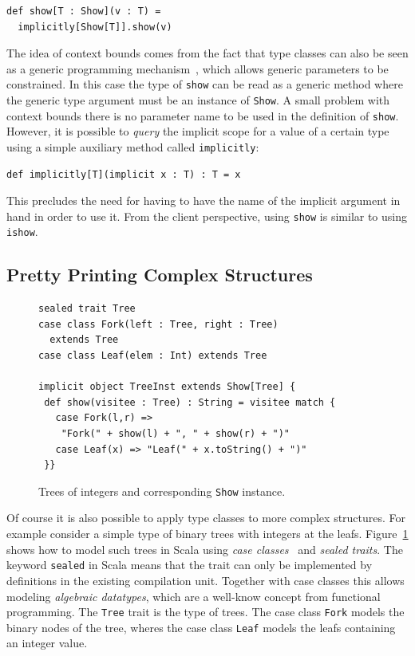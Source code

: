 \documentclass[preprint,nocopyrightspace]{sigplanconf}
\begin{document}
\begin{lstlisting}
def show[T : Show](v : T) = 
  implicitly[Show[T]].show(v)
\end{lstlisting}

The idea of context bounds comes from the fact that type classes can
also be seen as a generic programming mechanism~\cite{GP}, which allows
generic parameters to be constrained. In this case the type of
\lstinline{show} can be read as a generic method where the generic
type argument must be an instance of \lstinline{Show}.
A small problem with context bounds there is no parameter name to be used in the
definition of \lstinline{show}. However, it is possible to
\emph{query} the implicit scope for a value of a certain type
using a simple auxiliary method called \lstinline{implicitly}:

\begin{lstlisting}
def implicitly[T](implicit x : T) : T = x
\end{lstlisting}

This precludes the need for having to have the name of the implicit
argument in hand in order to use it.
From the client perspective, using \lstinline{show} is similar to
using \lstinline{ishow}.

\subsection{Pretty Printing Complex Structures}\label{sec:pretty-printing-complex}

\begin{figure}
\begin{lstlisting}
sealed trait Tree
case class Fork(left : Tree, right : Tree)
  extends Tree
case class Leaf(elem : Int) extends Tree

implicit object TreeInst extends Show[Tree] {
 def show(visitee : Tree) : String = visitee match {
   case Fork(l,r) =>
    "Fork(" + show(l) + ", " + show(r) + ")"
   case Leaf(x) => "Leaf(" + x.toString() + ")"
 }}
\end{lstlisting}
\caption{Trees of integers and corresponding \lstinline{Show}
  instance.}
\label{fig:trees}
\end{figure}

Of course it is also possible to apply type classes to more complex
structures. For example consider a simple type of binary trees with
integers at the leafs. Figure~\ref{fig:trees} shows how to model such
trees in Scala using \emph{case classes}~\cite{Match} and \emph{sealed
  traits}. The keyword \lstinline{sealed} in Scala means that the
trait can only be implemented by definitions in the existing
compilation unit.
Together with case classes this allows modeling \emph{algebraic
  datatypes}, which are a well-know concept from functional programming.
The \lstinline{Tree} trait is the type of trees. The case class
\lstinline{Fork} models the binary nodes of the tree, wheres the case
class \lstinline{Leaf} models the leafs containing an integer value.
\end{document}
